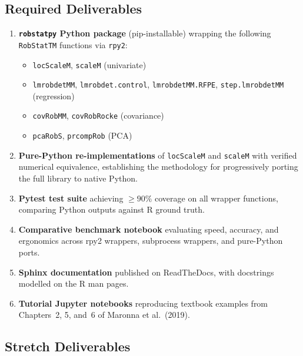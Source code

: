\documentclass[11pt, a4paper]{article}
\begin{document}
\subsection{Required Deliverables}

\begin{enumerate}[leftmargin=2em, itemsep=4pt]
  \item \textbf{\texttt{robstatpy} Python package} (pip-installable)
    wrapping the following \texttt{RobStatTM} functions via
    \texttt{rpy2}:
    \begin{itemize}[leftmargin=1.5em]
      \item \texttt{locScaleM}, \texttt{scaleM} (univariate)
      \item \texttt{lmrobdetMM}, \texttt{lmrobdet.control},
        \texttt{lmrobdetMM.RFPE}, \texttt{step.lmrobdetMM}
        (regression)
      \item \texttt{covRobMM}, \texttt{covRobRocke} (covariance)
      \item \texttt{pcaRobS}, \texttt{prcompRob} (PCA)
    \end{itemize}

  \item \textbf{Pure-Python re-implementations} of \texttt{locScaleM}
    and \texttt{scaleM} with verified numerical equivalence, establishing
    the methodology for progressively porting the full library to native
    Python.

  \item \textbf{Pytest test suite} achieving $\geq 90\%$ coverage on
    all wrapper functions, comparing Python outputs against R ground
    truth.

  \item \textbf{Comparative benchmark notebook} evaluating speed,
    accuracy, and ergonomics across rpy2 wrappers, subprocess wrappers,
    and pure-Python ports.

  \item \textbf{Sphinx documentation} published on ReadTheDocs, with
    docstrings modelled on the R man pages.

  \item \textbf{Tutorial Jupyter notebooks} reproducing textbook
    examples from Chapters~2, 5, and~6 of Maronna et al.\ (2019).
\end{enumerate}

\subsection{Stretch Deliverables}
\end{document}
